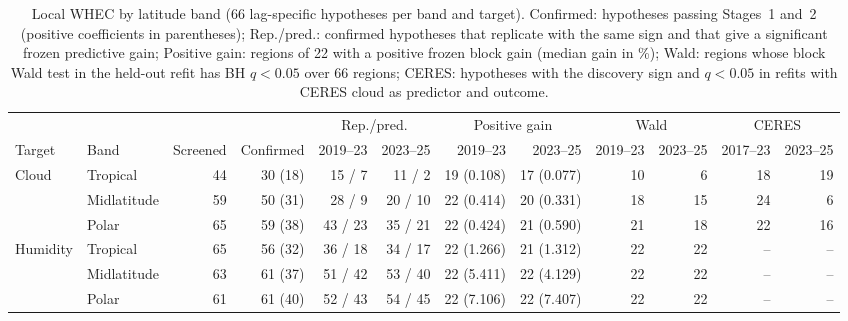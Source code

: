 \documentclass[11pt]{article}
\begin{document}
\begin{table}[htbp]
\centering
\caption{Local WHEC by latitude band (66 lag-specific hypotheses per band and target). Confirmed: hypotheses passing Stages~1 and~2 (positive coefficients in parentheses); Rep./pred.: confirmed hypotheses that replicate with the same sign and that give a significant frozen predictive gain; Positive gain: regions of 22 with a positive frozen block gain (median gain in \%); Wald: regions whose block Wald test in the held-out refit has BH $q<0.05$ over 66 regions; CERES: hypotheses with the discovery sign and $q<0.05$ in refits with CERES cloud as predictor and outcome.}
\label{tab:s17}
\scriptsize
\begin{adjustbox}{max width=\textwidth}\begin{tabular}{@{}llrrrrrrrrrr@{}}
\toprule
& & & & \multicolumn{2}{c}{Rep./pred.} & \multicolumn{2}{c}{Positive gain} & \multicolumn{2}{c}{Wald} & \multicolumn{2}{c}{CERES} \\
\cmidrule(lr){5-6}\cmidrule(lr){7-8}\cmidrule(lr){9-10}\cmidrule(lr){11-12}
Target & Band & Screened & Confirmed & 2019--23 & 2023--25 & 2019--23 & 2023--25 & 2019--23 & 2023--25 & 2017--23 & 2023--25 \\
\midrule
Cloud & Tropical & 44 & 30 (18) & 15 / 7 & 11 / 2 & 19 (0.108) & 17 (0.077) & 10 & 6 & 18 & 19 \\
 & Midlatitude & 59 & 50 (31) & 28 / 9 & 20 / 10 & 22 (0.414) & 20 (0.331) & 18 & 15 & 24 & 6 \\
 & Polar & 65 & 59 (38) & 43 / 23 & 35 / 21 & 22 (0.424) & 21 (0.590) & 21 & 18 & 22 & 16 \\
\addlinespace[2pt]
Humidity & Tropical & 65 & 56 (32) & 36 / 18 & 34 / 17 & 22 (1.266) & 21 (1.312) & 22 & 22 & -- & -- \\
 & Midlatitude & 63 & 61 (37) & 51 / 42 & 53 / 40 & 22 (5.411) & 22 (4.129) & 22 & 22 & -- & -- \\
 & Polar & 61 & 61 (40) & 52 / 43 & 54 / 45 & 22 (7.106) & 22 (7.407) & 22 & 22 & -- & -- \\
\bottomrule
\end{tabular}\end{adjustbox}
\end{table}
\end{document}

